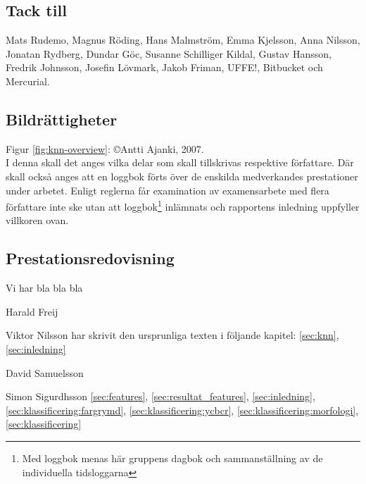 \documentclass[../rapport_MVEX01-11-05]{subfiles}
\begin{document}
    \subsection*{Tack till}
    Mats Rudemo, Magnus Röding, Hans Malmström, Emma Kjelsson, Anna Nilsson, Jonatan Rydberg, Dundar Göc, Susanne Schilliger Kildal, Gustav Hansson, Fredrik Johnsson, Josefin Lövmark, Jakob Friman, UFFE!, Bitbucket och Mercurial.

    \subsection*{Bildrättigheter}
    Figur \ref{fig:knn-overview}: \copyright Antti Ajanki, 2007.\\

    
I denna skall det anges vilka delar som skall tillskrivas respektive
författare. Där skall också anges att en loggbok förts över de
enskilda medverkandes prestationer under arbetet.
Enligt reglerna får examination av examensarbete med flera författare
inte ske utan att loggbok\footnote{Med loggbok menas här gruppens
dagbok och sammanställning av de individuella tidsloggarna} inlämnats
och rapportens inledning uppfyller villkoren ovan.

\subsection*{Prestationsredovisning}
Vi har bla bla bla

Harald Freij

Viktor Nilsson har skrivit den ursprunliga texten i följande kapitel:
\ref{sec:knn}, \ref{sec:inledning}

David Samuelsson

Simon Sigurdhsson \ref{sec:features}, \ref{sec:resultat_features},
\ref{sec:inledning}, \ref{sec:klassificering:fargrymd},
\ref{sec:klassificering:ycbcr}, \ref{sec:klassificering:morfologi}, \ref{sec:klassificering}
\end{document}
